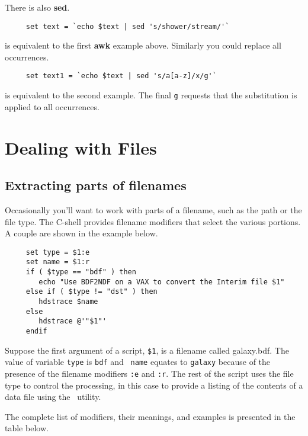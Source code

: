 There is also {\bf sed}.
\small
\begin{verbatim}
     set text = `echo $text | sed 's/shower/stream/'`
\end{verbatim}
\normalsize
is equivalent to the first {\bf awk} example above.  Similarly you could
replace all occurrences.

\small
\begin{verbatim}
     set text1 = `echo $text | sed 's/a[a-z]/x/g'`
\end{verbatim}
\normalsize
is equivalent to the second example.  The final {\tt g} requests that the
substitution is applied to all occurrences.

\newpage
\section{Dealing with Files\label{sc4_se_files}}


\subsection{Extracting parts of filenames
\label{sc4_se_filename_ext}}

Occasionally you'll want to work with parts of a filename, such as the
path or the file type.  The C-shell provides {\sf filename modifiers}
that select the various portions.  A couple are shown in the example
below.

\small
\begin{verbatim}
     set type = $1:e
     set name = $1:r
     if ( $type == "bdf" ) then
        echo "Use BDF2NDF on a VAX to convert the Interim file $1"
     else if ( $type != "dst" ) then
        hdstrace $name
     else
        hdstrace @'"$1"'
     endif
\end{verbatim}
\normalsize

Suppose the first argument of a script, {\tt \$1}, is a filename called
galaxy.bdf.  The value of variable {\tt type} is {\tt bdf} and {\tt
name} equates to {\tt galaxy} because of the presence of the filename
modifiers {\tt :e} and {\tt :r}.  The rest of the script uses the 
file type to control the processing, in this case to provide a listing
of the contents of a data file using the \HDSTRACEref\ utility.

The complete list of modifiers, their meanings, and examples is
presented in the table below.
\bigskip

